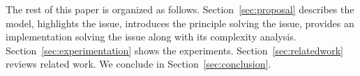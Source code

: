 The rest of this paper is organized as follows.
Section~\ref{sec:proposal} describes the model, highlights the issue, introduces
the principle solving the issue, provides an implementation solving the issue
along with its complexity analysis. Section~\ref{sec:experimentation} shows the
experiments. Section~\ref{sec:relatedwork} reviews related work. We conclude in
Section~\ref{sec:conclusion}.


